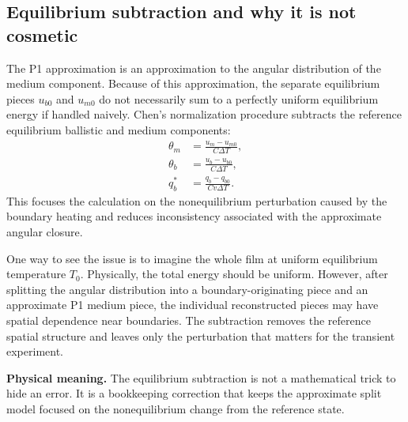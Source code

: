 \documentclass[11pt]{article}
\begin{document}
\subsection{Equilibrium subtraction and why it is not cosmetic}
The P1 approximation is an approximation to the angular distribution of the medium component. Because of this approximation, the separate equilibrium pieces \(u_{b0}\) and \(u_{m0}\) do not necessarily sum to a perfectly uniform equilibrium energy if handled naively. Chen's normalization procedure subtracts the reference equilibrium ballistic and medium components:
\begin{align}
    \theta_m &=\frac{u_m-u_{m0}}{C\Delta T},\label{eq:theta_m_subtraction}\\
    \theta_b &=\frac{u_b-u_{b0}}{C\Delta T},\label{eq:theta_b_subtraction}\\
    q_b^* &=\frac{q_b-q_{b0}}{C v\Delta T}.\label{eq:qb_subtraction}
\end{align}
This focuses the calculation on the nonequilibrium perturbation caused by the boundary heating and reduces inconsistency associated with the approximate angular closure.

One way to see the issue is to imagine the whole film at uniform equilibrium temperature \(T_0\). Physically, the total energy should be uniform. However, after splitting the angular distribution into a boundary-originating piece and an approximate P1 medium piece, the individual reconstructed pieces may have spatial dependence near boundaries. The subtraction removes the reference spatial structure and leaves only the perturbation that matters for the transient experiment.

\begin{physicsbox}
\textbf{Physical meaning.} The equilibrium subtraction is not a mathematical trick to hide an error. It is a bookkeeping correction that keeps the approximate split model focused on the nonequilibrium change from the reference state.
\end{physicsbox}
\end{document}
